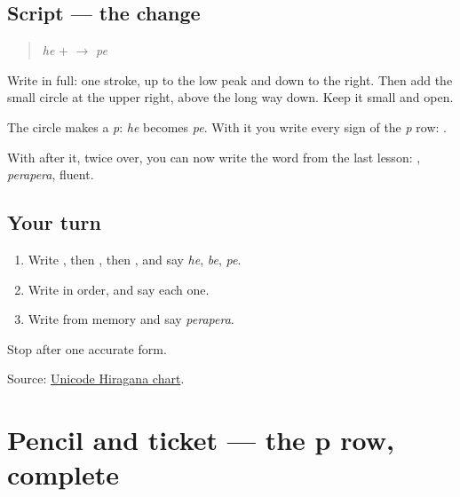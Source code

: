 \subsection*{Script — the change}

\begin{quote}
\textbf{} \emph{he} + \textbf{} $\to$ \textbf{} \emph{pe}
\end{quote}

Write \textbf{} in full: one stroke, up to the low peak and down to the right. Then add the small circle at the upper right, above the long way down. Keep it small and open.

The circle makes a \emph{p}: \emph{he} becomes \emph{pe}. With it you write every sign of the \emph{p} row: \textbf{    }.

With \textbf{} after it, twice over, you can now write the word from the last lesson: \textbf{}, \emph{perapera}, fluent.

\subsection*{Your turn}
\begin{enumerate}
\raggedright
  \item Write \textbf{}, then \textbf{}, then \textbf{}, and say \emph{he}, \emph{be}, \emph{pe}.
  \item Write \textbf{    } in order, and say each one.
  \item Write \textbf{} from memory and say \emph{perapera}.
\end{enumerate}

\begin{tcolorbox}[breakable,colback=teal!4,colframe=teal!35!black,title={Before you move on}]
Stop after one accurate form.

Source: \href{https://www.unicode.org/charts/PDF/U3040.pdf}{Unicode Hiragana chart}.
\end{tcolorbox}
\section[(dialogue)]{Pencil and ticket — the p row, complete}

\label{lesson:JA-R137-pencil-and-ticket}



